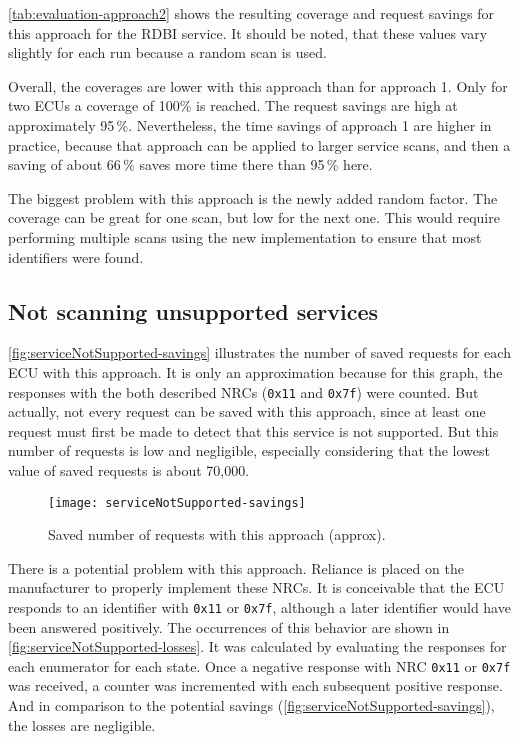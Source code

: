 \autoref{tab:evaluation-approach2} shows the resulting coverage and request savings for this approach for the RDBI service. It should be noted, that these values vary slightly for each run because a random scan is used.

Overall, the coverages are lower with this approach than for approach 1. Only for two ECUs a coverage of 100\% is reached. The request savings are high at approximately 95\,\%. Nevertheless, the time savings of approach 1 are higher in practice, because that approach can be applied to larger service scans, and then a saving of about 66\,\% saves more time there than 95\,\% here.

The biggest problem with this approach is the newly added random factor. The coverage can be great for one scan, but low for the next one. This would require performing multiple scans using the new implementation to ensure that most identifiers were found.

\subsection{Not scanning unsupported services}

\autoref{fig:serviceNotSupported-savings} illustrates the number of saved requests for each ECU with this approach. It is only an approximation because for this graph, the responses with the both described NRCs (\texttt{0x11} and \texttt{0x7f}) were counted. But actually, not every request can be saved with this approach, since at least one request must first be made to detect that this service is not supported. But this number of requests is low and negligible, especially considering that the lowest value of saved requests is about 70,000.

\begin{figure}[htb]
    \centering
    \texttt{[image: serviceNotSupported-savings]}
    \caption{Saved number of requests with this approach (approx).}
    \label{fig:serviceNotSupported-savings}
\end{figure}

There is a potential problem with this approach. Reliance is placed on the manufacturer to properly implement these NRCs. It is conceivable that the ECU responds to an identifier with \texttt{0x11} or \texttt{0x7f}, although a later identifier would have been answered positively. The occurrences of this behavior are shown in \autoref{fig:serviceNotSupported-losses}. It was calculated by evaluating the responses for each enumerator for each state. Once a negative response with NRC \texttt{0x11} or \texttt{0x7f} was received, a counter was incremented with each subsequent positive response.
And in comparison to the potential savings (\autoref{fig:serviceNotSupported-savings}), the losses are negligible.

